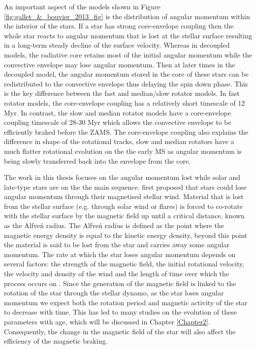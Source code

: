 An important aspect of the models shown in Figure \ref{fig:gallet_&_bouvier_2013_fig} is the distribution of angular momentum within the interior of the stars. If a star has strong core-envelope coupling then the whole star reacts to angular momentum that is lost at the stellar surface resulting in a long-term steady decline of the surface velocity. Whereas in decoupled models, the radiative core retains most of the initial angular momentum while the convective envelope may lose angular momentum. Then at later times in the decoupled model, the angular momentum stored in the core of these stars can be redistributed to the convective envelope thus delaying the spin down phase. This is the key difference between the fast and median/slow rotator models. In fast rotator models, the core-envelope coupling has a relatively short timescale of 12 Myr. In contrast, the slow and median rotator models have a core-envelope coupling timescale of 28-30 Myr which allows the convective envelope to be efficiently braked before the ZAMS. The core-envelope coupling also explains the difference in shape of the rotational tracks, slow and median rotators have a much flatter rotational evolution on the the early MS as angular momentum is being slowly transferred back into the envelope from the core.

The work in this thesis focuses on the angular momentum lost while solar and late-type stars are on the the main sequence. \citet{Schatzman_1962} first proposed that stars could lose angular momentum through their magnetised stellar wind. Material that is lost from the stellar surface (e.g. through solar wind or flares) is forced to co-rotate with the stellar surface by the magnetic field up until a critical distance, known as the Alfve\'n radius. The Alfve\'n radius is defined as the point where the magnetic energy density is equal to the kinetic energy density, beyond this point the material is said to be lost from the star and carries away some angular momentum. The rate at which the star loses angular momentum depends on several factors: the strength of the magnetic field, the initial rotational velocity, the velocity and density of the wind and the length of time over which the process occurs on \citep{Weber_&_Davis_1967}. Since the generation of the magnetic field is linked to the rotation of the star through the stellar dynamo, as the star loses angular momentum we expect both the rotation period and magnetic activity of the star to decrease with time. This has led to many studies on the evolution of these parameters with age, which will be discussed in Chapter \ref{Chapter2}. Consequently, the change in the magnetic field of the star will also affect the efficiency of the magnetic braking.

